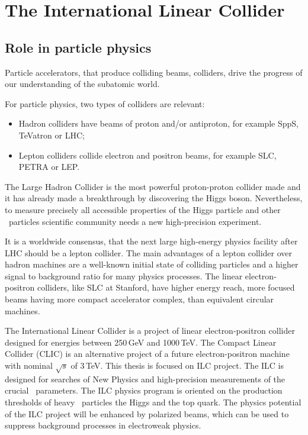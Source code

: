 
\section{The International Linear Collider}
\subsection{Role in particle physics}
Particle accelerators, that produce colliding beams, colliders, drive the progress of our understanding of the subatomic world.

For particle physics, two types of colliders are relevant:
\begin{itemize}
\item Hadron colliders have beams of proton and/or antiproton, for example SppS, TeVatron or LHC;
\item Lepton colliders collide electron and positron beams, for example SLC, PETRA or LEP.
\end{itemize}


The Large Hadron Collider is the most powerful proton-proton collider made and it has already made a breakthrough by discovering the Higgs boson.  Nevertheless, to measure precisely all accessible properties of the Higgs particle and other \sm\ particles scientific community needs a new high-precision experiment.

It is a worldwide consensus, that the next large high-energy physics facility after LHC should be a lepton collider. 
The main advantages of a lepton collider over hadron machines are a well-known initial state of colliding particles and a higher signal to background ratio for many physics processes.
The linear electron-positron colliders, like SLC at Stanford, have higher energy reach, more focused beams having more compact accelerator complex, than equivalent circular machines.

The International Linear Collider is a project of linear electron-positron collider designed for energies between 250\,GeV and 1000\,TeV. 
The Compact Linear Collider (CLIC) is an alternative project of a future electron-positron machine with nominal $\sqrt s$ of 3\,TeV. 
This thesis is focused on ILC project.
The ILC is designed for searches of New Physics and high-precision measurements of the crucial \sm\  parameters. 
The ILC physics program is oriented on the production thresholds of heavy \sm\ particles the Higgs and the top quark. 
The physics potential of the ILC project will be enhanced by polarized beams, which can be used to suppress background processes in electroweak physics. 


